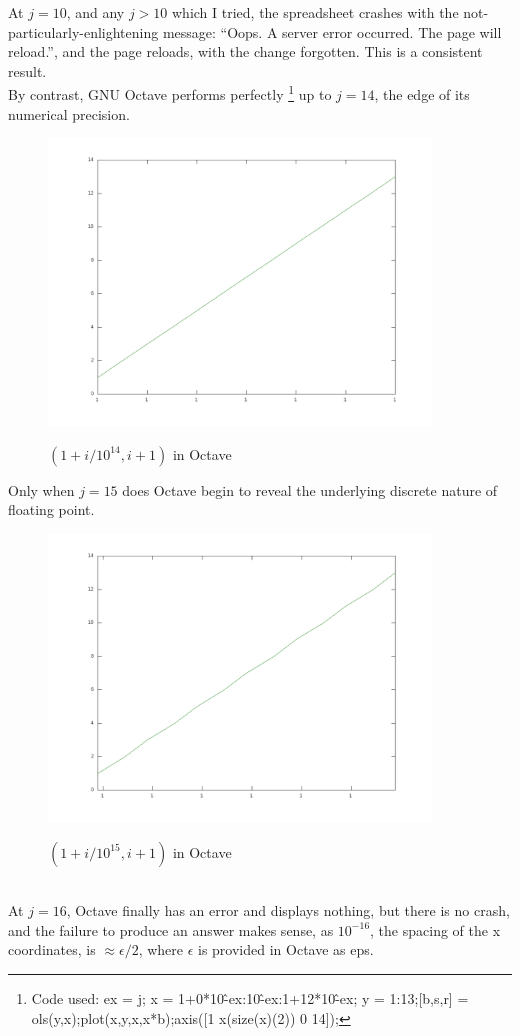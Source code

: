 \documentclass{article}
\begin{document}
At $j=10$, and any $j > 10$ which I tried, the spreadsheet crashes with the not-particularly-enlightening message:
``Oops.  A server error occurred. The page will reload.'', and the page reloads,
with the change forgotten.  This is a consistent result.\\

By contrast, GNU Octave performs perfectly
\footnote{Code used: ex = j; x = 1+0*10\^-ex:10\^-ex:1+12*10\^-ex; y = 1:13;[b,s,r] = ols(y,x);plot(x,y,x,x*b);axis([1 x(size(x)(2)) 0 14]);}
up to $j=14$, the edge of its numerical precision.\\
\begin{figure}[h!]
  \caption{${(1 + i/10^{14}, i + 1)}$ in Octave}
  \centering
\includegraphics[width=4in]{TRENDocj14.png}\\
\end{figure}
\newpage
Only when $j=15$ does Octave begin to reveal the underlying discrete nature of floating point.\\
\begin{figure}[h!]
  \caption{${(1 + i/10^{15}, i + 1)}$ in Octave}
  \centering
\includegraphics[width=4in]{TRENDocj15.png}\\
\end{figure}\\
At $j=16$, Octave finally has an error and displays nothing, but there is no crash, and 
the failure to produce an answer makes sense, as $10^{-16}$, the spacing of the x coordinates,
is $\approx \epsilon/2$, where $\epsilon$ is provided in Octave as eps.\\
\end{document}
